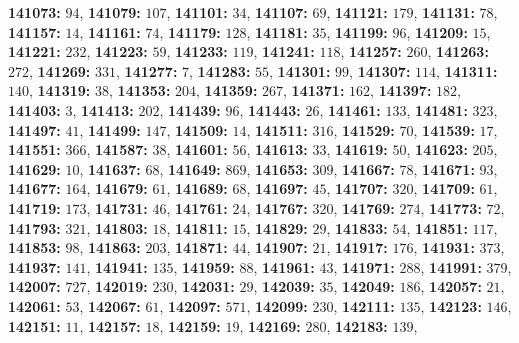 \textsf{\bfseries 141073:} $94$, \textsf{\bfseries 141079:} $107$, \textsf{\bfseries 141101:} $34$, \textsf{\bfseries 141107:} $69$, \textsf{\bfseries 141121:} $179$, \textsf{\bfseries 141131:} $78$, \textsf{\bfseries 141157:} $14$, \textsf{\bfseries 141161:} $74$, \textsf{\bfseries 141179:} $128$, \textsf{\bfseries 141181:} $35$, \textsf{\bfseries 141199:} $96$, \textsf{\bfseries 141209:} $15$, \textsf{\bfseries 141221:} $232$, \textsf{\bfseries 141223:} $59$, \textsf{\bfseries 141233:} $119$, \textsf{\bfseries 141241:} $118$, \textsf{\bfseries 141257:} $260$, \textsf{\bfseries 141263:} $272$, \textsf{\bfseries 141269:} $331$, \textsf{\bfseries 141277:} $7$, \textsf{\bfseries 141283:} $55$, \textsf{\bfseries 141301:} $99$, \textsf{\bfseries 141307:} $114$, \textsf{\bfseries 141311:} $140$, \textsf{\bfseries 141319:} $38$, \textsf{\bfseries 141353:} $204$, \textsf{\bfseries 141359:} $267$, \textsf{\bfseries 141371:} $162$, \textsf{\bfseries 141397:} $182$, \textsf{\bfseries 141403:} $3$, \textsf{\bfseries 141413:} $202$, \textsf{\bfseries 141439:} $96$, \textsf{\bfseries 141443:} $26$, \textsf{\bfseries 141461:} $133$, \textsf{\bfseries 141481:} $323$, \textsf{\bfseries 141497:} $41$, \textsf{\bfseries 141499:} $147$, \textsf{\bfseries 141509:} $14$, \textsf{\bfseries 141511:} $316$, \textsf{\bfseries 141529:} $70$, \textsf{\bfseries 141539:} $17$, \textsf{\bfseries 141551:} $366$, \textsf{\bfseries 141587:} $38$, \textsf{\bfseries 141601:} $56$, \textsf{\bfseries 141613:} $33$, \textsf{\bfseries 141619:} $50$, \textsf{\bfseries 141623:} $205$, \textsf{\bfseries 141629:} $10$, \textsf{\bfseries 141637:} $68$, \textsf{\bfseries 141649:} $869$, \textsf{\bfseries 141653:} $309$, \textsf{\bfseries 141667:} $78$, \textsf{\bfseries 141671:} $93$, \textsf{\bfseries 141677:} $164$, \textsf{\bfseries 141679:} $61$, \textsf{\bfseries 141689:} $68$, \textsf{\bfseries 141697:} $45$, \textsf{\bfseries 141707:} $320$, \textsf{\bfseries 141709:} $61$, \textsf{\bfseries 141719:} $173$, \textsf{\bfseries 141731:} $46$, \textsf{\bfseries 141761:} $24$, \textsf{\bfseries 141767:} $320$, \textsf{\bfseries 141769:} $274$, \textsf{\bfseries 141773:} $72$, \textsf{\bfseries 141793:} $321$, \textsf{\bfseries 141803:} $18$, \textsf{\bfseries 141811:} $15$, \textsf{\bfseries 141829:} $29$, \textsf{\bfseries 141833:} $54$, \textsf{\bfseries 141851:} $117$, \textsf{\bfseries 141853:} $98$, \textsf{\bfseries 141863:} $203$, \textsf{\bfseries 141871:} $44$, \textsf{\bfseries 141907:} $21$, \textsf{\bfseries 141917:} $176$, \textsf{\bfseries 141931:} $373$, \textsf{\bfseries 141937:} $141$, \textsf{\bfseries 141941:} $135$, \textsf{\bfseries 141959:} $88$, \textsf{\bfseries 141961:} $43$, \textsf{\bfseries 141971:} $288$, \textsf{\bfseries 141991:} $379$, \textsf{\bfseries 142007:} $727$, \textsf{\bfseries 142019:} $230$, \textsf{\bfseries 142031:} $29$, \textsf{\bfseries 142039:} $35$, \textsf{\bfseries 142049:} $186$, \textsf{\bfseries 142057:} $21$, \textsf{\bfseries 142061:} $53$, \textsf{\bfseries 142067:} $61$, \textsf{\bfseries 142097:} $571$, \textsf{\bfseries 142099:} $230$, \textsf{\bfseries 142111:} $135$, \textsf{\bfseries 142123:} $146$, \textsf{\bfseries 142151:} $11$, \textsf{\bfseries 142157:} $18$, \textsf{\bfseries 142159:} $19$, \textsf{\bfseries 142169:} $280$, \textsf{\bfseries 142183:} $139$, 
